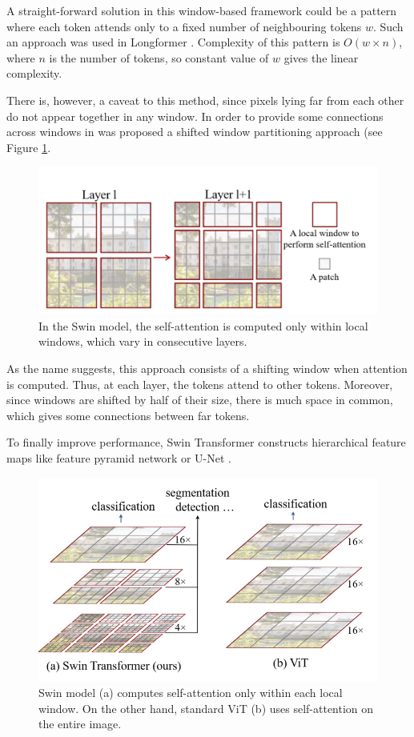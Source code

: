 \documentclass[magisterska,en]{pracamgr}
\begin{document}
A straight-forward solution in this window-based framework could be a pattern where each token attends only to a fixed number of neighbouring tokens $w$. Such an approach was used in Longformer \cite{DBLP:journals/corr/abs-2004-05150}. Complexity of this pattern is $O(w \times n)$, where $n$ is the number of tokens, so constant
value of $w$ gives the linear complexity.

There is, however, a caveat to this method, since pixels lying far from each other do not appear together in any window. In order to provide some connections across windows in \cite{DBLP:conf/iccv/LiuL00W0LG21} was proposed a shifted window partitioning approach (see Figure \ref{changing_windows}.


\begin{figure}[H]
\centering
\includegraphics[scale=0.6]{./images/changing_windows.png}
\caption{In the Swin model, the self-attention is computed only within local windows, which vary in consecutive layers.}
\label{changing_windows}
\end{figure}

As the name suggests, this approach consists of a shifting window when attention is computed. Thus, at each layer, the tokens attend to other tokens. Moreover, since windows are shifted by half of their size, there is much space in common, which gives some connections between far tokens.

To finally improve performance, Swin Transformer constructs hierarchical feature maps like feature pyramid network \cite{DBLP:conf/cvpr/LinDGHHB17} or U-Net \cite{DBLP:conf/miccai/RonnebergerFB15}.

\begin{figure}[H]
\centering
\includegraphics[scale=0.3]{./images/Swin_window.png}
\caption{Swin model (a) computes self-attention only within each local window. On the other hand, standard ViT (b) uses self-attention on the entire image.}
\end{figure}
\end{document}
